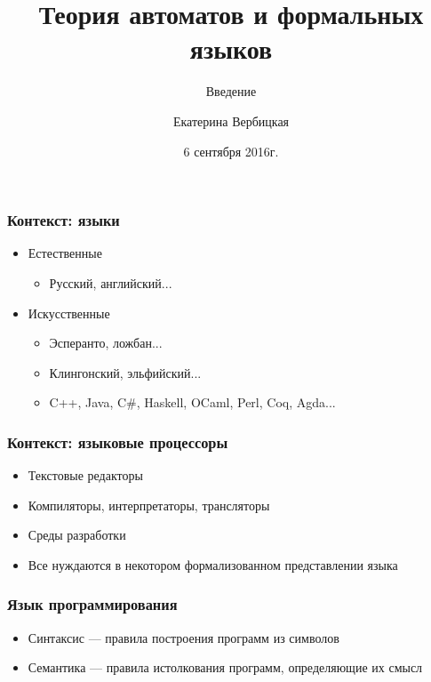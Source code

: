 \documentclass{beamer}
\title[]{Теория автоматов и формальных языков}
\subtitle[]{Введение}
\institute[]{
Санкт-Петербургский государственный электротехнический университет <<ЛЭТИ>>\\
}
\author[]{Екатерина Вербицкая}
\date{6 сентября 2016г.}
\begin{document}
{
  \begin{frame}
    \titlepage
  \end{frame}
}


\begin{frame}[fragile]
  \transwipe[direction=90]
  \frametitle{Контекст: языки}
  \begin{itemize}
    \item Естественные 
    \begin{itemize}
      \item Русский, английский...
    \end{itemize}    
    \pause
    \item Искусственные
    \begin{itemize}
      \item Эсперанто, ложбан...
      \item Клингонский, эльфийский...
      \pause
      \item C++, Java, C\#, Haskell, OCaml, Perl, Coq, Agda...
    \end{itemize}
  \end{itemize}
\end{frame}
            

\begin{frame}[fragile]
  \transwipe[direction=90]
  \frametitle{Контекст: языковые процессоры}
  \begin{itemize}
    \item Текстовые редакторы
    \item Компиляторы, интерпретаторы, трансляторы
    \item Среды разработки
  \end{itemize}

  \begin{itemize}
    \item Все нуждаются в некотором формализованном представлении языка
  \end{itemize}
\end{frame}

\begin{frame}[fragile]
  \transwipe[direction=90]
  \frametitle{Язык программирования}
  \begin{itemize}
    \item Синтаксис --- правила построения программ из символов
    \item Семантика --- правила истолкования программ, определяющие их смысл
  \end{itemize}
\end{frame}
\end{document}
